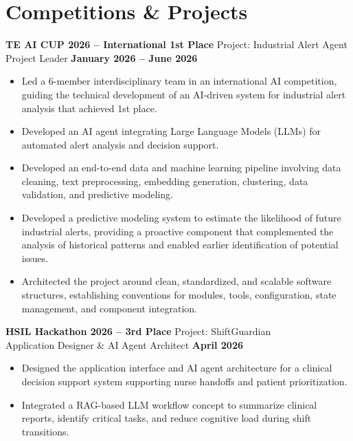 \documentclass[11pt]{article}
\begin{document}
\section*{Competitions \& Projects}
\textbf{TE AI CUP 2026 -- International 1st Place} \hfill Project: Industrial Alert Agent\\
Project Leader \hfill \textbf{January 2026 -- June 2026}
\vspace{-0.3cm}
\begin{itemize}[leftmargin=*]
    \item Led a 6-member interdisciplinary team in an international AI competition, guiding the technical development of an AI-driven system for industrial alert analysis that achieved 1st place. 

    \vspace{-0.3cm} 
    \item Developed an AI agent integrating Large Language Models (LLMs) for automated alert analysis and decision support.

    \vspace{-0.3cm} 
    \item Developed an end-to-end data and machine learning pipeline involving data cleaning, text preprocessing, embedding generation, clustering, data validation, and predictive modeling. 

    \vspace{-0.3cm}
    \item Developed a predictive modeling system to estimate the likelihood of future industrial alerts, providing a proactive component that complemented the analysis of historical patterns and enabled earlier identification of potential issues.

    \vspace{-0.3cm} 
    \item Architected the project around clean, standardized, and scalable software structures, establishing conventions for modules, tools, configuration, state management, and component integration. 
\end{itemize}



\textbf{HSIL Hackathon 2026 -- 3rd Place} \hfill Project: ShiftGuardian\\
Application Designer \& AI Agent Architect \hfill \textbf{April 2026}
\vspace{-0.3cm}
\begin{itemize}[leftmargin=*]
    \item Designed the application interface and AI agent architecture for a clinical decision support system supporting nurse handoffs and patient prioritization.
    
    \vspace{-0.3cm}
    \item Integrated a RAG-based LLM workflow concept to summarize clinical reports, identify critical tasks, and reduce cognitive load during shift transitions.
\end{itemize}
\end{document}
